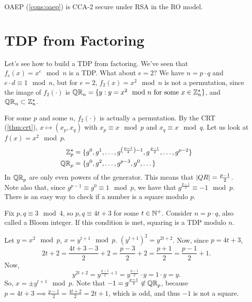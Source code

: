 \begin{theorem}
	\ac{OAEP} (\cref{cons:oaep}) is \ac{CCA}-2 secure under \ac{RSA} in the \ac{RO} model.
\end{theorem}

\section{\acl{TDP} from Factoring}

Let's see how to build a \ac{TDP} from factoring.
We've seen that $f_e(x) = x^e \mod n$ is a \ac{TDP}.
What about $e = 2$?
We have $n = p \cdot q$ and $e \cdot d \equiv 1 \mod n$, but for $e = 2$, $f_2(x) = x^2 \mod n$ is not a permutation, since the image of $f_2(\cdot)$ is $\QR[n] = \{ y : y = x^2 \mod n \text{ for some } x \in \Integers_n^{\star}\}$, and $\QR[n] \subset \Integers_n^{\star}$.

For some $p$ and some $n$, $f_2(\cdot)$ is actually a permutation. 
By the \ac{CRT} (\cref{thm:crt}), $x \mapsto (x_p, x_q)$ with $x_p \equiv x \mod p$ and $x_q \equiv x \mod q$.
Let us look at $f(x) = x^2 \mod p$.
\begin{align*}
	\Integers_p^{\star} & = \{
		g^0, g^1, \dots, g^{\left(\frac{p-1}{2}\right) - 1}, g^{\frac{p-1}{2}}, \dots, g^{p-2}
	\} \\
	\QR & = \{
		g^0, g^2, \dots, g^{p-3}, g^0, \dots
	\}
\end{align*}
In $\QR$ are only even powers of the generator.
This means that $\abs{QR} = \frac{p-1}{2}$.
Note also that, since $g^{p-1} \equiv g^0 \equiv 1 \mod p$, we have that $g^{\frac{p-1}{2}} \equiv -1 \mod p$.
There is an easy way to check if a number is a square modulo $p$.

Fix $p, q \equiv 3 \mod 4$, so $p, q \equiv 4 t + 3$ for some $t \in \Naturals$.
Consider $n = p \cdot q$, also called a Bloom integer.
If this condition is met, squaring is a \ac{TDP} modulo $n$.

Let $y = x^2 \mod p$, $x = y^{t+1} \mod p$.
$\left(y^{t+1}\right)^2 = y^{2t+2}$.
Now, since $p = 4t + 3$,
\begin{equation*}
	2t + 2 =
	\frac{4t + 3 - 3}{2} + 2 =
	\frac{p-3}{2} + 2 =
	\frac{p+1}{2} =
	\frac{p - 1}{2} + 1.
\end{equation*}
Now,
\begin{equation*}
	y^{2t+2} =
	y^{\frac{p-1}{2} + 1} =
	y^{\frac{p-1}{2}} \cdot y =
	1 \cdot y = y.
\end{equation*}
So, $x = \pm y^{t+1} \mod p$.
Note that $-1 = g^{\frac{p-1}{2}} \not\in \QR$, because $p = 4t + 3 \implies \frac{p-1}{2} = \frac{4t + 2}{2} = 2t+1$, which is odd, and thus $-1$ is not a square.

